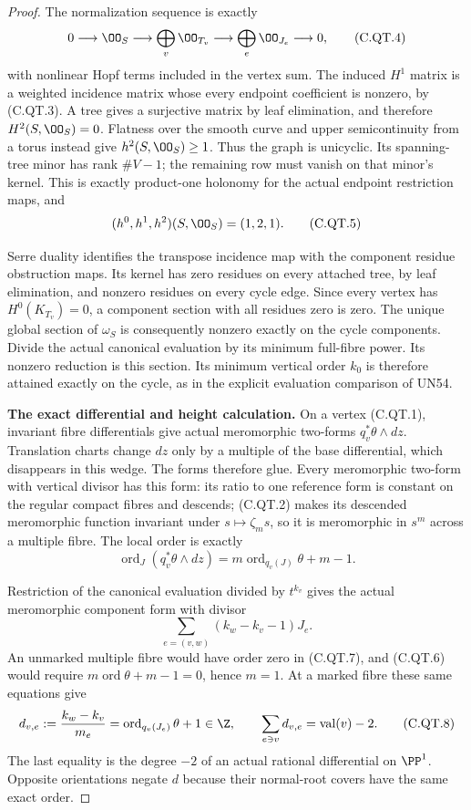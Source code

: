 \begin{proof}
The normalization sequence is exactly
\[
 0\longrightarrow\OO_S\longrightarrow
   \bigoplus_v\OO_{T_v}\longrightarrow
   \bigoplus_e\OO_{J_e}\longrightarrow0,
\tag{C.QT.4}
\]
with nonlinear Hopf terms included in the vertex
sum. The induced $H^1$ matrix is a weighted
incidence matrix whose every endpoint coefficient
is nonzero, by (C.QT.3). A tree gives a surjective
matrix by leaf elimination, and therefore
$H^2(S,\OO_S)=0$. Flatness over the smooth curve
and upper semicontinuity from a torus instead
give $h^2(S,\OO_S)\ge1$. Thus the graph is
unicyclic. Its spanning-tree minor has rank
$\#V-1$; the remaining row must vanish on that
minor's kernel. This is exactly product-one
holonomy for the actual endpoint restriction
maps, and
\[
                    (h^0,h^1,h^2)(S,\OO_S)=(1,2,1).
\tag{C.QT.5}
\]

Serre duality identifies the transpose incidence
map with the component residue obstruction maps.
Its kernel has zero residues on every attached
tree, by leaf elimination, and nonzero residues
on every cycle edge. Since every vertex has
$H^0(K_{T_v})=0$, a component section with all
residues zero is zero. The unique global section
of $\omega_S$ is consequently nonzero exactly
on the cycle components. Divide the actual
canonical evaluation by its minimum full-fibre
power. Its nonzero reduction is this section.
Its minimum vertical order $k_0$ is therefore
attained exactly on the cycle, as in the explicit
evaluation comparison of UN54.

\par\medskip\noindent\textbf{The exact differential and height calculation.}
On a vertex (C.QT.1), invariant fibre differentials
give actual meromorphic two-forms
$q_v^*\theta\wedge dz$. Translation charts
change $dz$ only by a multiple of the base
differential, which disappears in this wedge.
The forms therefore glue. Every meromorphic
two-form with vertical divisor has this form:
its ratio to one reference form is constant
on the regular compact fibres and descends;
(C.QT.2) makes its descended meromorphic
function invariant under $s\mapsto\zeta_ms$,
so it is meromorphic in $s^m$ across a multiple
fibre. The local order is exactly
\[
 \operatorname{ord}_{J}(q_v^*\theta\wedge dz)
             =m\operatorname{ord}_{q_v(J)}\theta+m-1.
\tag{C.QT.6}
\]

Restriction of the canonical evaluation divided
by $t^{k_v}$ gives the actual meromorphic
component form with divisor
\[
           \sum_{e=(v,w)}(k_w-k_v-1)J_e.
\tag{C.QT.7}
\]
An unmarked multiple fibre would have order zero
in (C.QT.7), and (C.QT.6) would require
$m\operatorname{ord}\theta+m-1=0$, hence $m=1$.
At a marked fibre these same equations give
\[
 d_{v,e}:=\frac{k_w-k_v}{m_e}
       =\operatorname{ord}_{q_v(J_e)}\theta+1\in\Z,
 \qquad\sum_{e\ni v}d_{v,e}=\operatorname{val}(v)-2.
\tag{C.QT.8}
\]
The last equality is the degree $-2$ of an
actual rational differential on $\PP^1$.
Opposite orientations negate $d$ because their
normal-root covers have the same exact order.


\end{proof}
